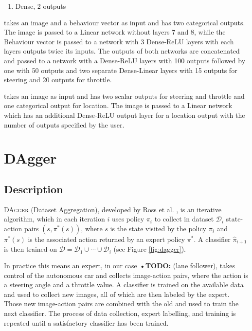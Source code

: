 \documentclass[conference]{IEEEtran}
\begin{document}
\begin{description}
\begin{enumerate}
\item
Dense, 2 outputs
\end{enumerate}
\item[Behaviour] takes an image and a behaviour vector as input and has two categorical outputs. The image is passed to a Linear network without layers 7 and 8, while the Behaviour vector is passed to a network with 3 Dense-ReLU layers with each layers outputs twice its inputs. The outputs of both networks are concatenated and passed to a network with a Dense-ReLU layers with 100 outputs followed by one with 50 outputs and two separate Dense-Linear layers with 15 outputs for steering and 20 outputs for throttle.
\item[Localizer] takes an image as input and has two scalar outputs for steering and throttle and one categorical output for location. The image is passed to a Linear network which has an additional Dense-ReLU output layer for a location output with the number of outputs specified by the user.
\end{description}


\section{DAgger}

\subsection{Description}

DA\textsc{gger} (Dataset Aggregation), developed by Ross et al. \cite{Ross2011}, is an iterative algorithm, which in each iteration \( i \) uses policy \( \pi_i \) to collect in dataset \( \mathcal{D}_i \) state-action pairs \( (s,\pi^*(s)) \), where \( s \) is the state visited by the policy \( \pi_i \) and \( \pi^*(s) \) is the associated action returned by an expert policy \( \pi^* \). A classifier \( \hat{ \pi}_{i+1} \) is then trained on \( \mathcal{D} = \mathcal{D}_1 \cup \dotsm \cup \mathcal{D}_i \) (see Figure \ref{fig:dagger}).

In practice this means an expert, in our case \textbf{•TODO:} (lane follower), takes control of the autonomous car and collects image-action pairs, where the action is a steering angle and a throttle value. A classifier is trained on the available data and used to collect new images, all of which are then labeled by the expert. Those new image-action pairs are combined with the old and used to train the next classifier. The process of data collection, expert labelling, and training is repeated until a satisfactory classifier has been trained.
\end{document}
